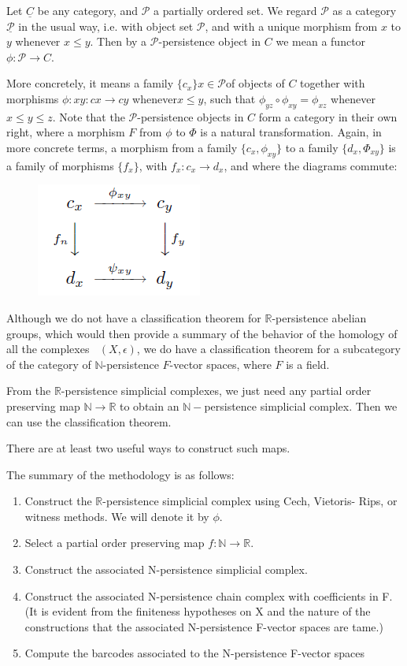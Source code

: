 \documentclass[11pt,reqno,oneside,a4paper]{article}
\DeclareMathOperator{\Cech}{\check{C}}
\begin{document}
\begin{defn}
	Let $\underline{C}$ be any category, and $\mathcal{P}$ a partially ordered set. We regard $\mathcal{P}$
	as a category $\underline{\mathcal{P}}$ in the usual way, i.e. with object set $\mathcal{P}$, and with a unique morphism	from $x$ to $y$ whenever $x \leq y$. Then by a $\mathcal{P}$-persistence object in $C$ we mean a functor
	$\phi : \mathcal{P} \to C$.
	
	 More concretely, it means a family $\{c_x\}{x\in \mathcal{P}} $of objects of $C$ together with morphisms $\phi: xy : cx \to cy$ whenever$ x \leq y$, such that $\phi_{yz} \circ \phi_{xy} = \phi_{xz}$ whenever $x \leq y \leq z$. Note that the $\mathcal{P}$-persistence objects in $C$ form a category in their own	right, where a morphism $F$ from $\phi$ to $\Phi$ is a natural transformation. Again, in
	more concrete terms, a morphism from a family $\{c_x, \phi_{xy}\}$ to a family $\{d_x, \Phi_{xy}\}$ is a family of morphisms $\{f_x\}$, with $f_x : c_x \to d_x$, and where the diagrams commute:
	\begin{figure}[H]
		\centering
		\includegraphics[width=0.3\linewidth]{figures/tda5-1.png}
		\label{fig:tda5-1}
	\end{figure}
\end{defn}

Although we do not have a classification theorem for $\mathbb{R}$-persistence abelian groups, which would then provide a summary of the behavior of the homology of all the complexes $\Cech(X,\epsilon)$, we do have a classification theorem for a subcategory of the category of $\mathbb{N}$-persistence $F$-vector spaces, where $F$ is a field. 

From the $\mathbb{R}$-persistence simplicial complexes, we just need any partial order preserving map $\mathbb{N} \to \mathbb{R}$ to obtain an $\mathbb{N}-$persistence simplicial complex. Then we can use the classification theorem. 

There are at least two useful ways to construct such maps. 

The summary of the methodology is as follows:
\begin{enumerate}
	\item Construct the $\mathbb{R}$-persistence simplicial complex using Cech, Vietoris-
	Rips, or witness methods. We will denote it by $\phi$.
	\item Select a partial order preserving map $f: \mathbb{N} \to \mathbb{R}$.
	\item Construct the associated N-persistence simplicial complex.
	\item Construct the associated N-persistence chain complex with coefficients
	in F. (It is evident from the finiteness hypotheses on X and
	the nature of the constructions that the associated N-persistence F-vector
	spaces are tame.)
	\item Compute the barcodes associated to the N-persistence F-vector spaces
\end{enumerate}
\end{document}
